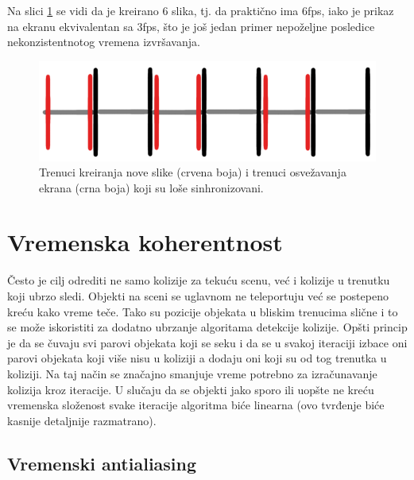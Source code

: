 \documentclass[12pt,oneside]{memoir}
\begin{document}
Na slici \ref{fig:fpsdiv2} se vidi da je kreirano 6 slika, tj. da praktično ima 6fps, iako je prikaz na ekranu 
ekvivalentan sa 3fps, što je još jedan primer nepoželjne posledice nekonzistentnotog vremena izvršavanja. 

\begin{figure}[h!]
	\begin{center}
	\includegraphics[scale=0.5]{fpsdiv2.png}
	\end{center}
	\caption{ Trenuci kreiranja nove slike (crvena boja) i trenuci osvežavanja ekrana (crna boja) koji su loše sinhronizovani. }
	\label{fig:fpsdiv2}
\end{figure}

\section{Vremenska koherentnost}

Često je cilj odrediti ne samo kolizije za tekuću scenu, već i kolizije u trenutku koji ubrzo sledi.
Objekti na sceni se uglavnom ne teleportuju već se postepeno kreću kako vreme teče.
Tako su pozicije objekata u bliskim trenucima slične i to se može iskoristiti za dodatno ubrzanje algoritama detekcije kolizije. 
Opšti princip je da se čuvaju svi parovi objekata koji se seku i da se u svakoj iteraciji 
izbace oni parovi objekata koji više nisu u koliziji a dodaju oni koji su od tog trenutka u koliziji.
Na taj način se značajno smanjuje vreme potrebno za izračunavanje kolizija kroz iteracije.
U slučaju da se objekti jako sporo ili uopšte ne kreću 
vremenska složenost svake iteracije algoritma biće linearna (ovo tvrđenje biće kasnije detaljnije razmatrano).


\subsection{Vremenski antialiasing}
\end{document}
